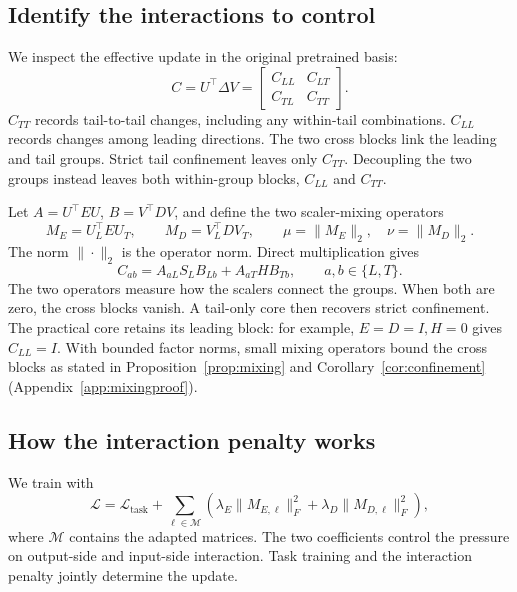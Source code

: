 \documentclass{article}
\begin{document}
\subsection{Identify the interactions to control}
We inspect the effective update in the original pretrained basis:
\begin{equation}
C=U^\top\Delta V=
\begin{bmatrix}C_{LL}&C_{LT}\\C_{TL}&C_{TT}\end{bmatrix}.
\label{eq:coordinates}
\end{equation}
$C_{TT}$ records tail-to-tail changes, including any within-tail combinations. $C_{LL}$ records changes among leading directions. The two cross blocks link the leading and tail groups. Strict tail confinement leaves only $C_{TT}$. Decoupling the two groups instead leaves both within-group blocks, $C_{LL}$ and $C_{TT}$.

Let $A=U^\top EU$, $B=V^\top DV$, and define the two scaler-mixing operators
\begin{equation}
M_E=U_L^\top EU_T,\qquad M_D=V_L^\top DV_T,\qquad
\mu=\|M_E\|_2,\quad\nu=\|M_D\|_2.
\label{eq:mixingoperators}
\end{equation}
The norm $\|\cdot\|_2$ is the operator norm. Direct multiplication gives
\begin{equation}
C_{ab}=A_{aL}S_LB_{Lb}+A_{aT}HB_{Tb},\qquad a,b\in\{L,T\}.
\label{eq:blockidentity}
\end{equation}
The two operators measure how the scalers connect the groups. When both are zero, the cross blocks vanish. A tail-only core then recovers strict confinement. The practical core retains its leading block: for example, $E=D=I,H=0$ gives $C_{LL}=I$. With bounded factor norms, small mixing operators bound the cross blocks as stated in Proposition~\ref{prop:mixing} and Corollary~\ref{cor:confinement} (Appendix~\ref{app:mixingproof}).

\subsection{How the interaction penalty works}
We train with
\begin{equation}
\mathcal L=\mathcal L_{\mathrm{task}}+
\sum_{\ell\in\mathcal M}\left(\lambda_E\|M_{E,\ell}\|_F^2+
\lambda_D\|M_{D,\ell}\|_F^2\right),
\label{eq:regularizer}
\end{equation}
where $\mathcal M$ contains the adapted matrices. The two coefficients control the pressure on output-side and input-side interaction. Task training and the interaction penalty jointly determine the update.
\end{document}
